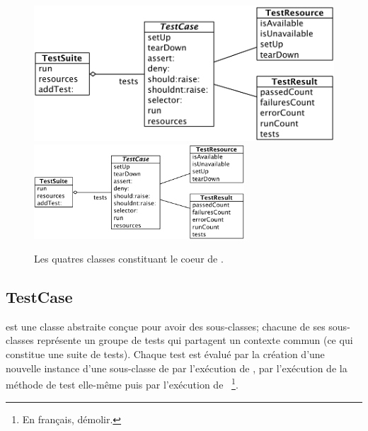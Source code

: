 \documentclass[a4paper,10pt,twoside]{book}
\begin{document}
\begin{figure}[htb]
  \begin{center}
  	\ifluluelse
		{\includegraphics[width=\textwidth]{sunit-classes}}
		{\includegraphics[width=0.7\textwidth]{sunit-classes}}
	\caption{Les quatres classes constituant le coeur de \SUnit.}
	\label{fig:sunit-classes}
  \end{center}
\end{figure}


\subsection{TestCase}

 est une classe abstraite conçue pour avoir des sous-classes; chacune de ses sous-classes représente un groupe de tests qui partagent un contexte commun (ce qui constitue une suite de tests). 
Chaque test est évalué par la création d'une nouvelle instance d'une sous-classe de  par l'exécution de , par l'exécution de la méthode de test elle-même puis par l'exécution de ~\footnote{En français, démolir.}.
\end{document}
